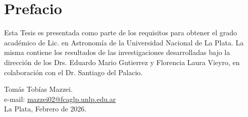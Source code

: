 \chapter{Prefacio}\label{cha:prefacio}

Esta Tesis es presentada como parte de los requisitos para obtener el grado acad\'emico de Lic. en Astronom\'ia de la Universidad Nacional de La Plata. 
La misma contiene los resultados de las investigaciones
desarrolladas bajo la direcci\'on de los Drs. Eduardo Mario Gutierrez y Florencia Laura Vieyro, en colaboraci\'on con 
el Dr. Santiago del Palacio.

\vspace*{5cm}

\begin{flushright}
Tom\'as Tob\'ias Mazzei.\\
e-mail: \url{mazzei02@fcaglp.unlp.edu.ar}\\
La Plata, Febrero de 2026. \\
\end{flushright}

\endinput
